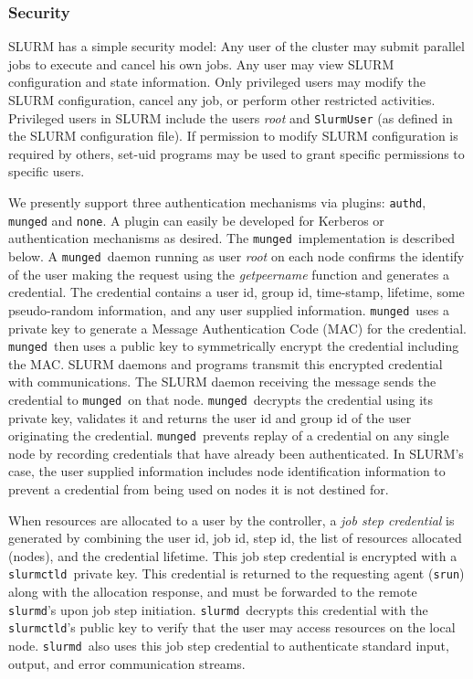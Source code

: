 \documentclass{article}
\newcommand{\munged}{{\tt munged}}
\newcommand{\slurmctld}{{\tt slurmctld}}
\newcommand{\slurmd}{{\tt slurmd}}
\begin{document}
\subsubsection{Security}

SLURM has a simple security model: 
Any user of the cluster may submit parallel jobs to execute and cancel
his own jobs.  Any user may view SLURM configuration and state
information.  
Only privileged users may modify the SLURM configuration,
cancel any job, or perform other restricted activities.  
Privileged users in SLURM include the users {\em root} 
and {\tt SlurmUser} (as defined in the SLURM configuration file). 
If permission to modify SLURM configuration is 
required by others, set-uid programs may be used to grant specific
permissions to specific users.

We presently support three authentication mechanisms via plugins: 
{\tt authd}\cite{Authd2002}, {\tt munged} and {\tt none}. 
A plugin can easily be developed for Kerberos or authentication 
mechanisms as desired.
The \munged\ implementation is described below.
A \munged\ daemon running as user {\em root} on each node confirms the 
identify of the user making the request using the {\em getpeername} 
function and generates a credential. 
The credential contains a user id, 
group id, time-stamp, lifetime, some pseudo-random information, and 
any user supplied information. \munged\ uses a private key to 
generate a Message Authentication Code (MAC) for the credential.
\munged\ then uses a public key to symmetrically encrypt 
the credential including the MAC. 
SLURM daemons and programs transmit this encrypted 
credential with communications. The SLURM daemon receiving the message 
sends the credential to \munged\ on that node. 
\munged\ decrypts the credential using its private key, validates it 
and returns the user id and group id of the user originating the 
credential.
\munged\ prevents replay of a credential on any single node 
by recording credentials that have already been authenticated.
In SLURM's case, the user supplied information includes node 
identification information to prevent a credential from being 
used on nodes it is not destined for.

When resources are allocated to a user by the controller, a 
{\em job step credential} is generated by combining the user id, job id, 
step id, the list of resources allocated (nodes), and the credential
lifetime. This job step credential is encrypted with 
a \slurmctld\ private key. This credential 
is returned to the requesting agent ({\tt srun}) along with the
allocation response, and must be forwarded to the remote {\tt slurmd}'s 
upon job step initiation. \slurmd\ decrypts this credential with the
\slurmctld 's public key to verify that the user may access
resources on the local node. \slurmd\ also uses this job step credential 
to authenticate standard input, output, and error communication streams. 
\end{document}

